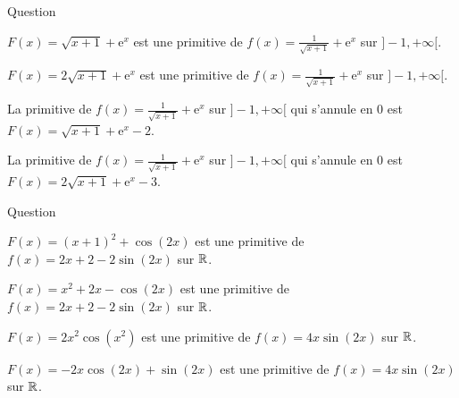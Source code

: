 \begin{multi}{Question}
    \item \(\displaystyle F(x)=\sqrt{x+1}+\mathrm{e}^{x}\) est une primitive de \(\displaystyle f(x)=\frac{1}{\sqrt{x+1}}+\mathrm{e}^{x}\) sur \(]-1,+\infty[\).
    \item* \(\displaystyle F(x)=2\sqrt{x+1}+\mathrm{e}^{x}\) est une primitive de \(\displaystyle f(x)=\frac{1}{\sqrt{x+1}}+\mathrm{e}^{x}\) sur \(]-1,+\infty[\).
    \item La primitive de \(\displaystyle f(x)=\frac{1}{\sqrt{x+1}}+\mathrm{e}^{x}\) sur \(]-1,+\infty[\) qui s'annule en \(0\) est \(\displaystyle F(x)=\sqrt{x+1}+\mathrm{e}^{x}-2\).
    \item* La primitive de \(\displaystyle f(x)=\frac{1}{\sqrt{x+1}}+\mathrm{e}^{x}\) sur \(]-1,+\infty[\) qui s'annule en \(0\) est \(\displaystyle F(x)=2\sqrt{x+1}+\mathrm{e}^{x}-3\).
\end{multi}


\begin{multi}[multiple,feedback=
{On a : \(\displaystyle \Big[(x+1)^2+\cos (2x)\Big]'=2x+2-2\sin (2x)\). Donc \(\displaystyle (x+1)^2+\cos (2x)\) est une primitive de \(\displaystyle 2x+2-2\sin (2x)\) sur \(\Rr\). De même, \(\displaystyle -2x\cos (2x)+\sin (2x)\) est une primitive de \(\displaystyle 4x\sin (2x)\) sur \(\Rr\).
}]{Question}
    \item* \(\displaystyle F(x)=(x+1)^2+\cos (2x)\) est une primitive de \(\displaystyle f(x)=2x+2-2\sin (2x)\) sur \(\Rr\).
    \item \(\displaystyle F(x)=x^2+2x-\cos (2x)\) est une primitive de \(\displaystyle f(x)=2x+2-2\sin (2x)\) sur \(\Rr\).
    \item \(\displaystyle F(x)=2x^2\cos (x^2)\) est une primitive de \(\displaystyle f(x)=4x\sin (2x)\) sur \(\Rr\).
    \item* \(\displaystyle F(x)=-2x\cos (2x)+\sin (2x)\) est une primitive de \(\displaystyle f(x)=4x\sin (2x)\) sur \(\Rr\).
\end{multi}


